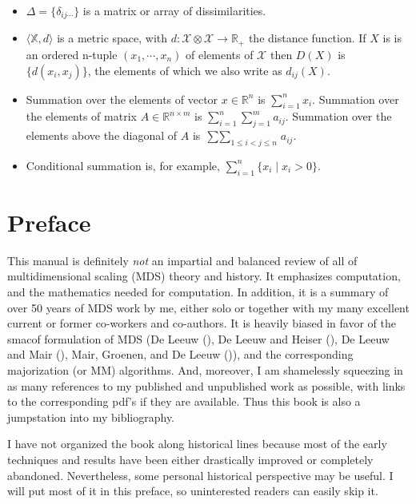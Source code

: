\documentclass[
  12pt,
  letterpaper,
  DIV=11,
  numbers=noendperiod]{scrartcl}
\newcommand{\sectionbreak}{\clearpage}
\begin{document}
\begin{itemize}
\item
  \(\Delta=\{\delta_{ij\cdots}\}\) is a matrix or array of
  dissimilarities.
\item
  \(\langle \mathbb{X},d\rangle\) is a metric space, with
  \(d:\mathcal{X}\otimes\mathcal{X}\rightarrow\mathbb{R}_+\) the
  distance function. If \(X\) is is an ordered n-tuple
  \((x_1,\cdots,x_n)\) of elements of \(\mathcal{X}\) then \(D(X)\) is
  \(\{d(x_i,x_j)\}\), the elements of which we also write as
  \(d_{ij}(X)\).
\item
  Summation over the elements of vector \(x\in\mathbb{R}^n\) is
  \(\sum_{i=1}^n x_i\). Summation over the elements of matrix
  \(A\in\mathbb{R}^{n\times m}\) is \(\sum_{i=1}^n\sum_{j=1}^m a_{ij}\).
  Summation over the elements above the diagonal of \(A\) is
  \(\mathop{\sum\sum}_{1\leq i<j\leq n}a_{ij}\).
\item
  Conditional summation is, for example,
  \(\sum_{i=1}^n \{x_i\mid x_i>0\}\).
\end{itemize}

\sectionbreak

\section*{Preface}\label{preface}

This manual is definitely \emph{not} an impartial and balanced review of
all of multidimensional scaling (MDS) theory and history. It emphasizes
computation, and the mathematics needed for computation. In addition, it
is a summary of over 50 years of MDS work by me, either solo or together
with my many excellent current or former co-workers and co-authors. It
is heavily biased in favor of the smacof formulation of MDS (De Leeuw
(), De Leeuw and Heiser
(), De Leeuw and Mair
(), Mair, Groenen, and De Leeuw
()), and the corresponding
majorization (or MM) algorithms. And, moreover, I am shamelessly
squeezing in as many references to my published and unpublished work as
possible, with links to the corresponding pdf's if they are available.
Thus this book is also a jumpstation into my bibliography.

I have not organized the book along historical lines because most of the
early techniques and results have been either drastically improved or
completely abandoned. Nevertheless, some personal historical perspective
may be useful. I will put most of it in this preface, so uninterested
readers can easily skip it.
\end{document}
